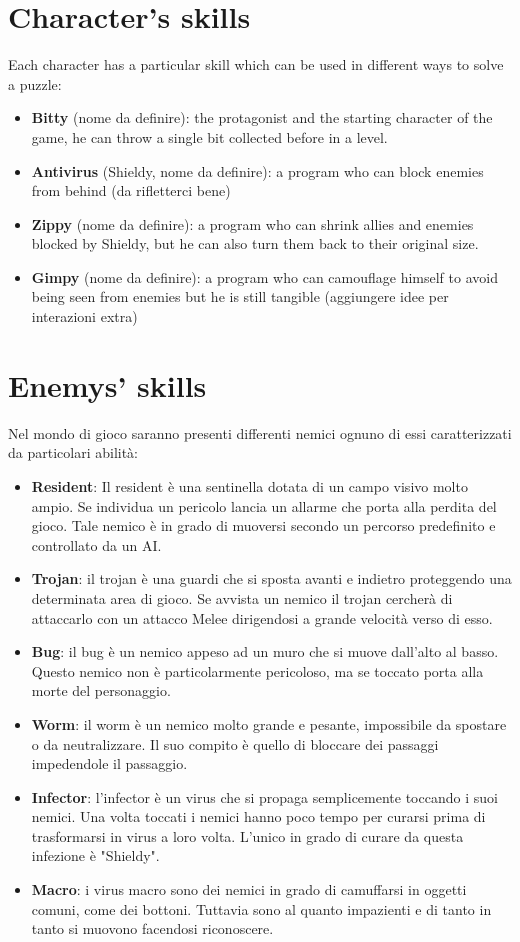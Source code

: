 \documentclass[12pt, a4paper]{report}
\begin{document}
\section*{Character’s skills}
Each character has a particular skill which can be used in different ways to solve a puzzle:
\begin{itemize}
\item \textbf{Bitty} (nome da definire): the protagonist and the starting character of the game, he can throw a single bit collected before in a level.
\item \textbf{Antivirus} (Shieldy, nome da definire): a program who can block enemies from behind (da rifletterci bene)
\item \textbf{Zippy} (nome da definire): a program who can shrink allies and enemies blocked by Shieldy, but he can also turn them back to their original size.
\item \textbf{Gimpy} (nome da definire): a program who can camouflage himself to avoid being seen from enemies but he is still tangible (aggiungere idee per interazioni extra)	
\end{itemize}

\section*{Enemys' skills}
Nel mondo di gioco saranno presenti differenti nemici ognuno di essi caratterizzati da particolari abilità:
\begin{itemize}
	\item \textbf{Resident}: Il resident è una sentinella dotata di un campo visivo molto ampio. Se individua un pericolo lancia un allarme che porta alla perdita del gioco. Tale nemico è in grado di muoversi secondo un percorso predefinito e controllato da un AI.
	\item \textbf{Trojan}: il trojan è una guardi che si sposta avanti e indietro proteggendo una determinata area di gioco. Se avvista un nemico il trojan cercherà di attaccarlo con un attacco Melee dirigendosi a grande velocità verso di esso.
	\item \textbf{Bug}: il bug è un nemico appeso ad un muro che si muove dall'alto al basso. Questo nemico non è particolarmente pericoloso, ma se toccato porta alla morte del personaggio.
	\item \textbf{Worm}: il worm è un nemico molto grande e pesante, impossibile da spostare o da neutralizzare. Il suo compito è quello di bloccare dei passaggi impedendole il passaggio.
	\item \textbf{Infector}: l'infector è un virus che si propaga semplicemente toccando i suoi nemici. Una volta toccati i nemici hanno poco tempo per curarsi prima di trasformarsi in virus a loro volta. L'unico in grado di curare da questa infezione è "Shieldy".
	\item \textbf{Macro}: i virus macro sono dei nemici in grado di camuffarsi in oggetti comuni, come dei bottoni. Tuttavia sono al quanto impazienti e di tanto in tanto si muovono facendosi riconoscere.
\end{itemize}
\end{document}
